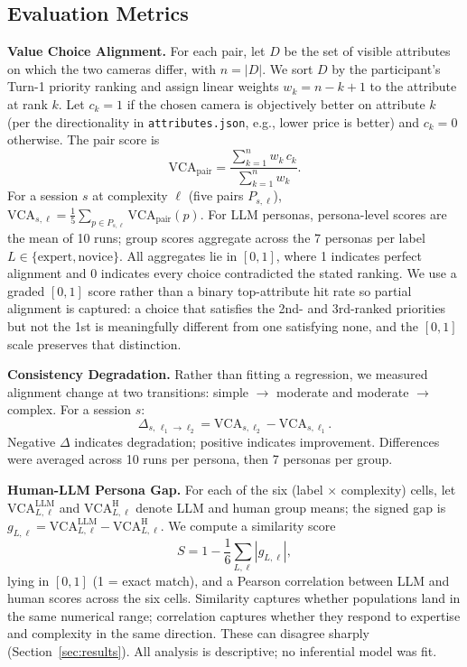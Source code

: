 \documentclass[manuscript,review]{acmart}
\begin{document}
\subsection{Evaluation Metrics}
\textbf{Value Choice Alignment.} For each pair, let $D$ be the set of visible attributes on which the two cameras differ, with $n = |D|$. We sort $D$ by the participant's Turn-1 priority ranking and assign linear weights $w_k = n - k + 1$ to the attribute at rank $k$. Let $c_k = 1$ if the chosen camera is objectively better on attribute $k$ (per the directionality in \texttt{attributes.json}, e.g., lower price is better) and $c_k = 0$ otherwise. The pair score is
\begin{equation}
\mathrm{VCA}_{\text{pair}} = \frac{\sum_{k=1}^{n} w_k \, c_k}{\sum_{k=1}^{n} w_k}.
\end{equation}
For a session $s$ at complexity $\ell$ (five pairs $P_{s,\ell}$), $\mathrm{VCA}_{s,\ell} = \frac{1}{5}\sum_{p \in P_{s,\ell}} \mathrm{VCA}_{\text{pair}}(p)$. For LLM personas, persona-level scores are the mean of 10 runs; group scores aggregate across the 7 personas per label $L \in \{\text{expert}, \text{novice}\}$. All aggregates lie in $[0,1]$, where 1 indicates perfect alignment and 0 indicates every choice contradicted the stated ranking. We use a graded $[0,1]$ score rather than a binary top-attribute hit rate so partial alignment is captured: a choice that satisfies the 2nd- and 3rd-ranked priorities but not the 1st is meaningfully different from one satisfying none, and the $[0,1]$ scale preserves that distinction.

\textbf{Consistency Degradation.} Rather than fitting a regression, we measured alignment change at two transitions: simple $\rightarrow$ moderate and moderate $\rightarrow$ complex. For a session $s$:
\begin{equation}
\Delta_{s,\,\ell_1 \rightarrow \ell_2} = \mathrm{VCA}_{s,\ell_2} - \mathrm{VCA}_{s,\ell_1}.
\end{equation}
Negative $\Delta$ indicates degradation; positive indicates improvement. Differences were averaged across 10 runs per persona, then 7 personas per group.

\textbf{Human-LLM Persona Gap.} For each of the six (label $\times$ complexity) cells, let $\mathrm{VCA}^{\text{LLM}}_{L,\ell}$ and $\mathrm{VCA}^{\text{H}}_{L,\ell}$ denote LLM and human group means; the signed gap is $g_{L,\ell} = \mathrm{VCA}^{\text{LLM}}_{L,\ell} - \mathrm{VCA}^{\text{H}}_{L,\ell}$. We compute a similarity score
\begin{equation}
S = 1 - \frac{1}{6}\sum_{L,\ell} |g_{L,\ell}|,
\end{equation}
lying in $[0,1]$ (1 = exact match), and a Pearson correlation between LLM and human scores across the six cells. Similarity captures whether populations land in the same numerical range; correlation captures whether they respond to expertise and complexity in the same direction. These can disagree sharply (Section~\ref{sec:results}). All analysis is descriptive; no inferential model was fit.
\end{document}
